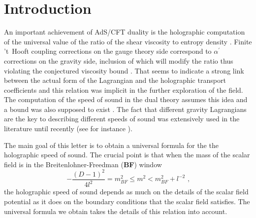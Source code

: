 \documentclass[11pt,epsf,letterpaper]{article}%
\begin{document}
\section{Introduction}

An important achievement of AdS/CFT duality \cite{Maldacena:1997re} is the
holographic computation of the universal value of the ratio of the shear
viscosity to entropy density \cite{Policastro:2001yc}. Finite 't~Hooft
coupling corrections on the gauge theory side correspond to $\alpha^{\prime}$
corrections on the gravity side, inclusion of which will modify the ratio thus
violating the conjectured viscosity bound \cite{Kats:2007mq, Brigante:2007nu}.
That seems to indicate a strong link between the actual form of the Lagrangian
and the holographic transport coefficients and this relation was implicit in
the further exploration of the field. The computation of the speed of sound
\cite{Gursoy:2007cb, Gursoy:2007er, Gubser:2008ny, Gubser:2008yx, He:2011hw}
in the dual theory assumes this idea and a bound was also supposed to exist
\cite{Cherman:2009tw}. The fact that different gravity Lagrangians are the key
to describing different speeds of sound was extensively used in the literature
until recently (see for instance \cite{Hoyos:2016cob}).

The main goal of this letter is to obtain a universal formula for the the
holographic speed of sound. The crucial point is that when the mass of the
scalar field is in the Breitenlohner-Freedman (\textbf{BF}) window
\cite{Breitenlohner:1982bm, BF}
\begin{equation}
-\frac{(D-1)^{2}}{4l^{2}}=m_{BF}^{2}\leq m^{2}<m_{BF}^{2}+l^{-2}\text{ ,}
\label{window}%
\end{equation}
the holographic speed of sound depends as much on the details of the scalar
field potential as it does on the boundary conditions that the scalar field
satisfies. The universal formula we obtain takes the details of this relation
into account.
\end{document}
